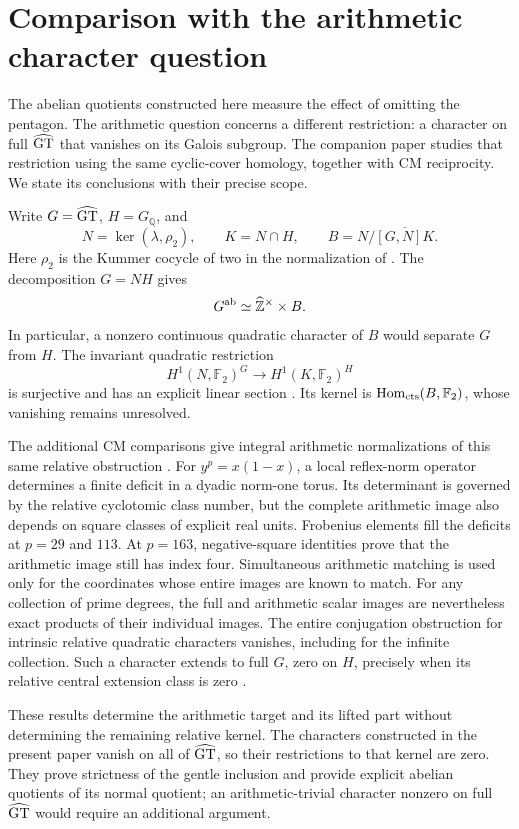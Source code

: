 \section{Comparison with the arithmetic character question}

The abelian quotients constructed here measure the effect of omitting
the pentagon. The arithmetic question concerns a different restriction:
a character on full \(\widehat{\mathrm{GT}}\) that vanishes on its Galois subgroup.
The companion paper \cite{ArithmeticCompanion} studies that restriction
using the same cyclic-cover homology, together with CM reciprocity.
We state its conclusions with their precise scope.

Write \(G=\widehat{\mathrm{GT}}\), \(H=G_{\mathbb Q}\), and
\[
 N=\ker(\lambda,\rho_2),\qquad K=N\cap H,\qquad
 B=N/\overline{[G,N]K}.
\]
Here \(\rho_2\) is the Kummer cocycle of two in the normalization
of \cite{H17}. The decomposition \(G=NH\) gives
\[
 G^{\rm ab}\simeq\widehat{\mathbb Z}^{\times}\times B.
\]
In particular, a nonzero continuous quadratic character of \(B\)
would separate \(G\) from \(H\).
The invariant quadratic restriction
\[
 H^1(N,\mathbb F_2)^G\longrightarrow H^1(K,\mathbb F_2)^H
\]
is surjective and has an explicit linear section
\cite[Theorems~1.1 and~1.6]{ArithmeticCompanion}.
Its kernel is \(\operatorname{Hom}_{\rm cts}(B,\mathbb F_2)\),
whose vanishing remains unresolved.

The additional CM comparisons give integral arithmetic normalizations
of this same relative obstruction
\cite[Theorem~1.14]{ArithmeticCompanion}.
For \(y^p=x(1-x)\), a local reflex-norm operator determines a finite
deficit in a dyadic norm-one torus. Its determinant is governed by
the relative cyclotomic class number, but the complete arithmetic
image also depends on square classes of explicit real units.
Frobenius elements fill the deficits at \(p=29\) and \(113\).
At \(p=163\), negative-square identities prove that the arithmetic
image still has index four. Simultaneous arithmetic matching is used
only for the coordinates whose entire images are known to match.
For any collection of prime degrees, the full and arithmetic scalar
images are nevertheless exact products of their individual images.
The entire conjugation obstruction for intrinsic relative quadratic
characters vanishes, including for the infinite collection. Such a
character extends to full \(G\), zero on \(H\), precisely when its
relative central extension class is zero
\cite[Theorem~1.16]{ArithmeticCompanion}.

These results determine the arithmetic target and its lifted part
without determining the remaining relative kernel. The characters
constructed in the present paper vanish on all of \(\widehat{\mathrm{GT}}\), so their
restrictions to that kernel are zero. They prove strictness of the
gentle inclusion and provide explicit abelian quotients of its
normal quotient; an arithmetic-trivial character nonzero on full
\(\widehat{\mathrm{GT}}\) would require an additional argument.
